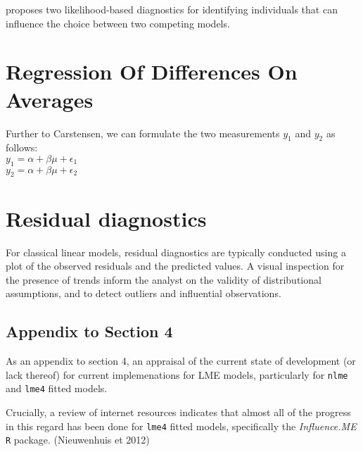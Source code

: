 \documentclass[12pt, a4paper]{report}
\theoremstyle{plain}
\theoremstyle{definition}
\theoremstyle{remark}
\begin{document}
\citet{Demi} proposes two likelihood-based diagnostics for identifying individuals that can influence the choice between two competing models.








\section{Regression Of Differences On Averages}
Further to Carstensen, we can formulate the two measurements
$y_{1}$ and $y_{2}$ as follows:
\\
$y_{1} = \alpha + \beta\mu + \epsilon_{1}$
\\
$y_{2} = \alpha + \beta\mu + \epsilon_{2}$


\section{Residual diagnostics} %
For classical linear models, residual diagnostics are typically conducted using a plot of the observed residuals and the predicted values. A visual inspection for the presence of trends inform the analyst on the validity of distributional assumptions, and to detect outliers and influential observations.

%
%
%

\subsection*{Appendix to Section 4}




As an appendix to section 4, an appraisal of the current state of development (or lack thereof) for current implemenations for LME models, particularly for
\texttt{nlme} and \texttt{lme4} fitted models.

Crucially, a review of internet resources indicates that almost all of the progress in this regard has been done for \texttt{lme4} fitted models, specifically the \textit{Influence.ME} \texttt{R} package. (Nieuwenhuis et 2012)
\end{document}
